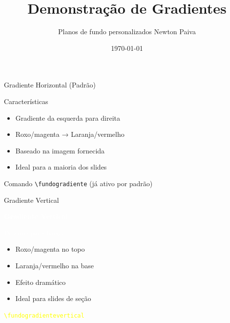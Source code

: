 \documentclass[aspectratio=169]{beamer}
\title{Demonstração de Gradientes}
\subtitle{Planos de fundo personalizados Newton Paiva}
\date{\today}
\begin{document}
\titlepagepadrao
\begin{frame}[plain]
    \maketitle
\end{frame}


\layoutpadrao

\begin{frame}{Gradiente Horizontal (Padrão)}
    \begin{block}{Características}
        \begin{itemize}
            \item Gradiente da esquerda para direita
            \item Roxo/magenta → Laranja/vermelho
            \item Baseado na imagem fornecida
            \item Ideal para a maioria dos slides
        \end{itemize}
    \end{block}
    
    \begin{exampleblock}{Comando}
        \texttt{\textbackslash fundogradiente} (já ativo por padrão)
    \end{exampleblock}
\end{frame}

\fundogradientevertical

\begin{frame}{Gradiente Vertical}
    \begin{center}
        \vfill
        \Huge{\textcolor{white}{\textbf{Gradiente Vertical}}}
        \vspace{1cm}
        
        \Large{\textcolor{white}{De cima para baixo}}
        \vspace{1cm}
        
        \begin{itemize}
            \item Roxo/magenta no topo
            \item Laranja/vermelho na base
            \item Efeito dramático
            \item Ideal para slides de seção
        \end{itemize}
        
        \vspace{1cm}
        \texttt{\textcolor{yellow}{\textbackslash fundogradientevertical}}
        \vfill
    \end{center}
\end{frame}
\end{document}
